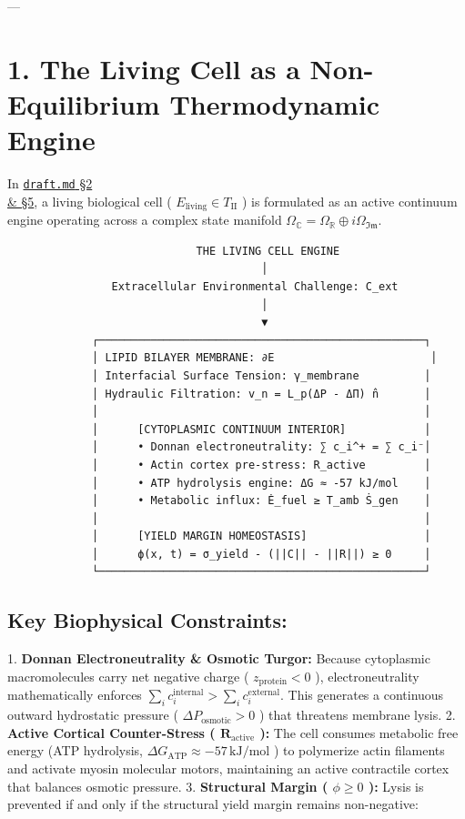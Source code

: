 \documentclass[11pt,a4paper]{article}
\theoremstyle{definition}
\theoremstyle{remark}
\begin{document}
---

\section{1. The Living Cell as a Non-Equilibrium Thermodynamic Engine}

In \href{../draft.md}{\texttt{draft.md} \S 2 \\& \S 5}, a living biological cell ( $E_{\text{living}} \in T_{\text{II}}$ ) is formulated as an active continuum engine operating across a complex state manifold $\Omega_{\mathbb{C}} = \Omega_{\mathbb{R}} \oplus i \Omega_{\mathfrak{Im}}$.

\begin{verbatim}
                             THE LIVING CELL ENGINE
                                       │
                Extracellular Environmental Challenge: C_ext
                                       │
                                       ▼
             ┌──────────────────────────────────────────────────┐
             │ LIPID BILAYER MEMBRANE: ∂E                        │
             │ Interfacial Surface Tension: γ_membrane          │
             │ Hydraulic Filtration: v_n = L_p(ΔP - ΔΠ) n̂       │
             │                                                  │
             │      [CYTOPLASMIC CONTINUUM INTERIOR]            │
             │      • Donnan electroneutrality: ∑ c_i^+ = ∑ c_i⁻│
             │      • Actin cortex pre-stress: R_active         │
             │      • ATP hydrolysis engine: ΔG ≈ -57 kJ/mol    │
             │      • Metabolic influx: Ė_fuel ≥ T_amb Ṡ_gen    │
             │                                                  │
             │      [YIELD MARGIN HOMEOSTASIS]                  │
             │      ϕ(x, t) = σ_yield - (||C|| - ||R||) ≥ 0     │
             └──────────────────────────────────────────────────┘
\end{verbatim}

\subsection{Key Biophysical Constraints:}
1. \textbf{Donnan Electroneutrality \& Osmotic Turgor:}
Because cytoplasmic macromolecules carry net negative charge ( $z_{\text{protein}} < 0$ ), electroneutrality mathematically enforces $\sum_i c_i^{\text{internal}} > \sum_i c_i^{\text{external}}$. This generates a continuous outward hydrostatic pressure ( $\Delta P_{\text{osmotic}} > 0$ ) that threatens membrane lysis.
2. \textbf{Active Cortical Counter-Stress ( $\mathbf{R}_{\text{active}}$ ):}
The cell consumes metabolic free energy (ATP hydrolysis, $\Delta G_{\text{ATP}} \approx -57 \, \mathrm{kJ/mol}$ ) to polymerize actin filaments and activate myosin molecular motors, maintaining an active contractile cortex that balances osmotic pressure.
3. \textbf{Structural Margin ( $\phi \ge 0$ ):}
Lysis is prevented if and only if the structural yield margin remains non-negative:
\end{document}

